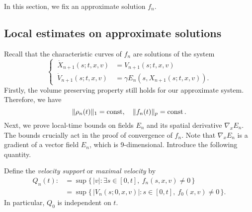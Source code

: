 \documentclass[12pt]{article}
\begin{document}
In this section, we fix an approximate solution $f_n$.


\subsection{Local estimates on approximate solutions}
Recall that the characteristic curves of $f_n$ are solutions of the system
\[\left\{\ \begin{alignedat}{2}
\dot X_{n+1}(s;t,x,v)&=V_{n+1}(s;t,x,v)\\
\dot V_{n+1}(s;t,x,v)&=\gamma E_n(s,X_{n+1}(s;t,x,v)).
\end{alignedat}\right.\]
Firstly, the volume preserving property still holds for our approximate system.
Therefore, we have
\[\|\rho_n(t)\|_1=\operatorname{const},\quad\|f_n(t)\|_p=\operatorname{const}.\]
Next, we prove local-time bounds on fields $E_n$ and its spatial derivative $\nabla_xE_n$.
The bounds crucially act in the proof of convergence of $f_n$.
Note that $\nabla_xE_n$ is a gradient of a vector field $E_n$, which is 9-dimensional.
Introduce the following quantity.
\begin{defn}
Define the \emph{velocity support} or \emph{maximal velocity} by
\begin{align*}
Q_n(t):&=\sup\{\,|v|:\exists s\in[0,t],\ f_n(s,x,v)\ne0\,\}\\
&=\sup\{\,|V_n(s;0,x,v)|:s\in[0,t],\ f_0(x,v)\ne0\,\}.
\end{align*}
In particular, $Q_0$ is independent on $t$.
\end{defn}
\end{document}
